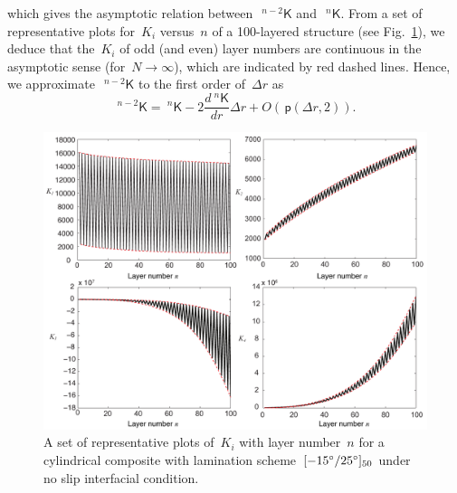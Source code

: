 \documentclass[preprint,10pt,times]{elsarticle}
\numberwithin{equation}{section}
\renewcommand{\u}[1]{\boldsymbol{#1}}
\newcommand{\usf}[1]{\u{\mathsf #1}}
\newcommand{\pr}[1]{\left( #1 \right)}
\newcommand{\p}{\,\mathsf{p}}
\renewcommand{\>}{$\Rightarrow$}
\begin{document}
which gives the asymptotic relation between~$~^{{n-2}}{\usf{K}}$ and~$~^{n}{\usf{K}}$.
From a set of representative plots for~$K_{i}$ versus~$n$ of a 100-layered structure (see Fig.~\ref{fig:two_material_no_slip_Ks}), we deduce that the~$K_{i}$ of odd (and even) layer numbers are continuous in the asymptotic sense (for~$N \to \infty$), which are indicated by red dashed lines. Hence, we approximate~$~^{{n-2}}{\usf{K}}$ to the first order of~$\Delta r$ as
\begin{equation}
	~^{{n-2}}{\usf{K}} = ~^{n}{\usf{K}} - 2\frac{d~^{n}{\usf{K}}}{dr} \Delta r + O(\p\pr{\Delta r,2}).
	\label{eq:knknm2appr2}
\end{equation}
\begin{figure}[t]
	\centering
	\graphicspath{{../LyxFiles/figure/}}
	\includegraphics[width=1\textwidth]{two_material_no_slip_Ks.pdf}
	\caption{A set of representative plots of~$K_i$ with layer number~$n$ for a cylindrical composite with lamination scheme~$[-15 \degree/25 \degree]_{50}$ under no slip interfacial condition.}
	\label{fig:two_material_no_slip_Ks}
\end{figure}
\end{document}
